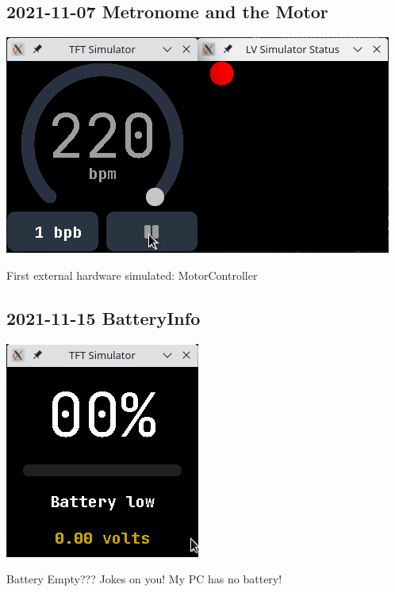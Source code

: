 \documentclass{beamer}
\begin{document}
\subsection{2021-11-07 Metronome and the Motor}
\begin{frame}{}
  \centering\includegraphics[width=\textwidth]{../2021-11-07_metronome_and_motor_status.png}

  First external hardware simulated: MotorController
\end{frame}

\subsection{2021-11-15 BatteryInfo}
\begin{frame}{}
  \centering\includegraphics[height=0.8\paperheight]{../2021-11-15_BatteryInfo.png}

  Battery Empty??? Jokes on you! My PC has no battery!
\end{frame}
\end{document}
